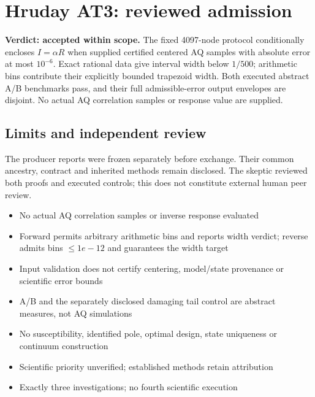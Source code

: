 \clearpage

\clearpage

\clearpage\section{Hruday AT3: reviewed admission}

\label{stmt:AT3}

\textbf{Verdict: accepted within scope.} The fixed 4097-node protocol conditionally encloses $I=\alpha R$ when supplied certified centered AQ samples with absolute error at most $10^{-6}$. Exact rational data give interval width below $1/500$; arithmetic bins contribute their explicitly bounded trapezoid width. Both executed abstract A/B benchmarks pass, and their full admissible-error output envelopes are disjoint. No actual AQ correlation samples or response value are supplied.

\subsection*{Limits and independent review}

The producer reports were frozen separately before exchange. Their common ancestry, contract and inherited methods remain disclosed. The skeptic reviewed both proofs and executed controls; this does not constitute external human peer review.

\begin{itemize}

\item No actual AQ correlation samples or inverse response evaluated

\item Forward permits arbitrary arithmetic bins and reports width verdict; reverse admits bins \(\le 1e-12\) and guarantees the width target

\item Input validation does not certify centering, model/state provenance or scientific error bounds

\item A/B and the separately disclosed damaging tail control are abstract measures, not AQ simulations

\item No susceptibility, identified pole, optimal design, state uniqueness or continuum construction

\item Scientific priority unverified; established methods retain attribution

\item Exactly three investigations; no fourth scientific execution

\end{itemize}

